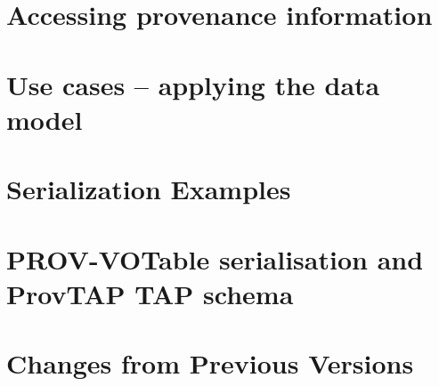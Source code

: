 \documentclass[11pt,a4paper]{ivoa}
\begin{document}
\section{Accessing provenance information}
\label{sec:provaccess}



\section{Use cases -- applying the data model}
\label{sec:usecases-implementations}


\begin{appendices}
\section{Serialization Examples}
\label{sec:appendix-serialization-examples}


\section{PROV-VOTable serialisation and ProvTAP TAP schema}
\label{sec:appendix-prov-votable}


\section{Changes from Previous Versions}

\end{appendices}
\end{document}
